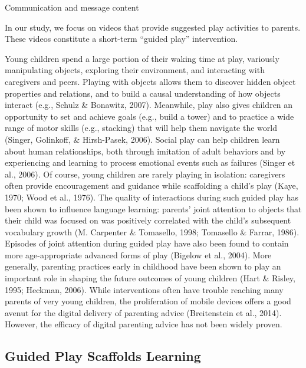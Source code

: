 \documentclass[]{article}
\begin{document}
Communication and message content

In our study, we focus on videos that provide suggested play activities
to parents. These videos constitute a short-term ``guided play''
intervention.

Young children spend a large portion of their waking time at play,
variously manipulating objects, exploring their environment, and
interacting with caregivers and peers. Playing with objects allows them
to discover hidden object properties and relations, and to build a
causal understanding of how objects interact (e.g., Schulz \& Bonawitz,
2007). Meanwhile, play also gives children an opportunity to set and
achieve goals (e.g., build a tower) and to practice a wide range of
motor skills (e.g., stacking) that will help them navigate the world
(Singer, Golinkoff, \& Hirsh-Pasek, 2006). Social play can help children
learn about human relationships, both through imitation of adult
behaviors and by experiencing and learning to process emotional events
such as failures (Singer et al., 2006). Of course, young children are
rarely playing in isolation: caregivers often provide encouragement and
guidance while scaffolding a child's play (Kaye, 1970; Wood et al.,
1976). The quality of interactions during such guided play has been
shown to influence language learning: parents' joint attention to
objects that their child was focused on was positively correlated with
the child's subsequent vocabulary growth (M. Carpenter \& Tomasello,
1998; Tomasello \& Farrar, 1986). Episodes of joint attention during
guided play have also been found to contain more age-appropriate
advanced forms of play (Bigelow et al., 2004). More generally, parenting
practices early in childhood have been shown to play an important role
in shaping the future outcomes of young children (Hart \& Risley, 1995;
Heckman, 2006). While interventions often have trouble reaching many
parents of very young children, the proliferation of mobile devices
offers a good avenut for the digital delivery of parenting advice
(Breitenstein et al., 2014). However, the efficacy of digital parenting
advice has not been widely proven.

\hypertarget{guided-play-scaffolds-learning}{%
\subsection{Guided Play Scaffolds
Learning}\label{guided-play-scaffolds-learning}}
\end{document}
